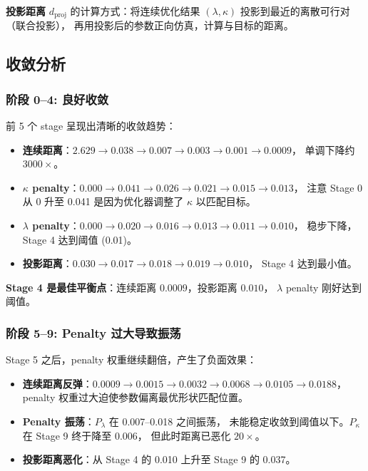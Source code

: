 \documentclass[12pt,a4paper]{article}
\begin{document}
\noindent \textbf{投影距离} $d_\text{proj}$ 的计算方式：将连续优化结果
$(\lambda, \kappa)$ 投影到最近的离散可行对（联合投影），
再用投影后的参数正向仿真，计算与目标的距离。

\subsection{收敛分析}

\subsubsection{阶段 0--4: 良好收敛}

前 5 个 stage 呈现出清晰的收敛趋势：
\begin{itemize}
    \item \textbf{连续距离}：$2.629 \to 0.038 \to 0.007 \to 0.003 \to 0.001 \to 0.0009$，
    单调下降约 $3000\times$。
    \item \textbf{$\kappa$ penalty}：$0.000 \to 0.041 \to 0.026 \to 0.021 \to 0.015 \to 0.013$，
    注意 Stage 0 从 0 升至 0.041 是因为优化器调整了 $\kappa$ 以匹配目标。
    \item \textbf{$\lambda$ penalty}：$0.000 \to 0.020 \to 0.016 \to 0.013 \to 0.011 \to 0.010$，
    稳步下降，Stage 4 达到阈值 (0.01)。
    \item \textbf{投影距离}：$0.030 \to 0.017 \to 0.018 \to 0.019 \to \mathbf{0.010}$，
    Stage 4 达到最小值。
\end{itemize}

\textbf{Stage 4 是最佳平衡点}：连续距离 $0.0009$，投影距离 $0.010$，
$\lambda$ penalty 刚好达到阈值。

\subsubsection{阶段 5--9: Penalty 过大导致振荡}

Stage 5 之后，penalty 权重继续翻倍，产生了负面效果：
\begin{itemize}
    \item \textbf{连续距离反弹}：$0.0009 \to 0.0015 \to 0.0032 \to 0.0068 \to 0.0105 \to 0.0188$，
    penalty 权重过大迫使参数偏离最优形状匹配位置。
    \item \textbf{Penalty 振荡}：$P_\lambda$ 在 0.007--0.018 之间振荡，
    未能稳定收敛到阈值以下。$P_\kappa$ 在 Stage 9 终于降至 0.006，
    但此时距离已恶化 $20\times$。
    \item \textbf{投影距离恶化}：从 Stage 4 的 0.010 上升至 Stage 9 的 0.037。
\end{itemize}
\end{document}
